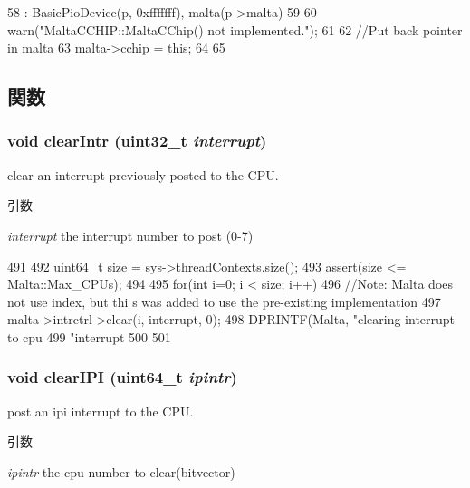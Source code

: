 \begin{DoxyCode}
58     : BasicPioDevice(p, 0xfffffff), malta(p->malta)
59 {
60     warn("MaltaCCHIP::MaltaCChip() not implemented.");
61 
62     //Put back pointer in malta
63     malta->cchip = this;
64 
65 }
\end{DoxyCode}


\subsection{関数}
\hypertarget{classMaltaCChip_af0c6cfe896197ad4db6e5d1ab37fe5fb}{
\subsubsection[{clearIntr}]{\setlength{\rightskip}{0pt plus 5cm}void clearIntr ({\bf uint32\_\-t} {\em interrupt})}}
\label{classMaltaCChip_af0c6cfe896197ad4db6e5d1ab37fe5fb}
clear an interrupt previously posted to the CPU. 
\begin{DoxyParams}{引数}
\item[{\em interrupt}]the interrupt number to post (0-\/7) \end{DoxyParams}



\begin{DoxyCode}
491 {
492     uint64_t size = sys->threadContexts.size();
493     assert(size <= Malta::Max_CPUs);
494 
495     for(int i=0; i < size; i++) {
496                                         //Note: Malta does not use index, but thi
      s was added to use the pre-existing implementation
497               malta->intrctrl->clear(i, interrupt, 0);
498               DPRINTF(Malta, "clearing interrupt to cpu %
499                         "interrupt %
500    }
501 }
\end{DoxyCode}
\hypertarget{classMaltaCChip_ad463cf06091847c5eef7aba24419eee0}{
\subsubsection[{clearIPI}]{\setlength{\rightskip}{0pt plus 5cm}void clearIPI (uint64\_\-t {\em ipintr})}}
\label{classMaltaCChip_ad463cf06091847c5eef7aba24419eee0}
post an ipi interrupt to the CPU. 
\begin{DoxyParams}{引数}
\item[{\em ipintr}]the cpu number to clear(bitvector) \end{DoxyParams}



